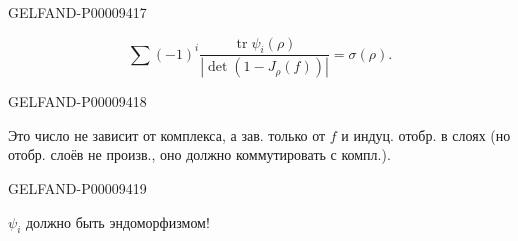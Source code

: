 \begin{GelfandAdjacentEvidence}{GELFAND-P000094}{17}

\begin{equation*}
\sum(-1)^i\frac{\operatorname{tr}\psi_i(\rho)}{|\det(1-J_\rho(f))|}
=\sigma(\rho).
\end{equation*}
\end{GelfandAdjacentEvidence}
\begin{GelfandAdjacentEvidence}{GELFAND-P000094}{18}

Это число не зависит от комплекса, а зав. только от $f$ и индуц. отобр. в слоях
(но отобр. слоёв не произв., оно должно коммутировать с компл.).
\end{GelfandAdjacentEvidence}
\begin{GelfandAdjacentEvidence}{GELFAND-P000094}{19}

$\psi_i$ должно быть эндоморфизмом!
\end{GelfandAdjacentEvidence}




